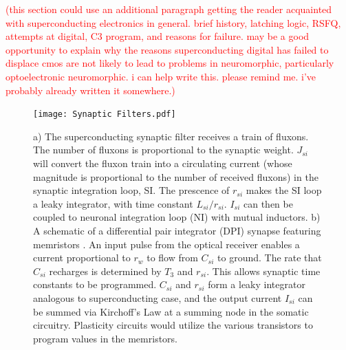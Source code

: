 \documentclass[twocolumn]{article}
\begin{document}
\textcolor{red}{(this section could use an additional paragraph getting the reader acquainted with superconducting electronics in general. brief history, latching logic, RSFQ, attempts at digital, C3 program, and reasons for failure. may be a good opportunity to explain why the reasons superconducting digital has failed to displace cmos are not likely to lead to problems in neuromorphic, particularly optoelectronic neuromorphic. i can help write this. please remind me. i've probably already written it somewhere.)}

\begin{figure}
    \centering
    \texttt{[image: Synaptic Filters.pdf]}
    \caption{a) The superconducting synaptic filter receives a train of fluxons. The number of fluxons is proportional to the synaptic weight. $J_{si}$ will convert the fluxon train into a circulating current (whose magnitude is proportional to the number of received fluxons) in the synaptic integration loop, SI. The prescence of $r_{si}$ makes the SI loop a leaky integrator, with time constant $L_{si}/r_{si}$. $I_{si}$ can then be coupled to neuronal integration loop (NI) with mutual inductors. b) A schematic of a differential pair integrator (DPI) synapse featuring memristors \cite{dalgaty2019hybrid}. An input pulse from the optical receiver enables a current proportional to $r_w$ to flow from $C_{si}$ to ground. The rate that $C_{si}$ recharges is determined by $T_3$ and $r_{si}$. This allows synaptic time constants to be programmed. $C_{si}$ and $r_{si}$ form a leaky integrator analogous to superconducting case, and the output current $I_{si}$ can be summed via Kirchoff's Law at a summing node in the somatic circuitry. Plasticity circuits would utilize the various transistors to program values in the memristors.}
    \label{fig:filtering}
\end{figure}
\end{document}
